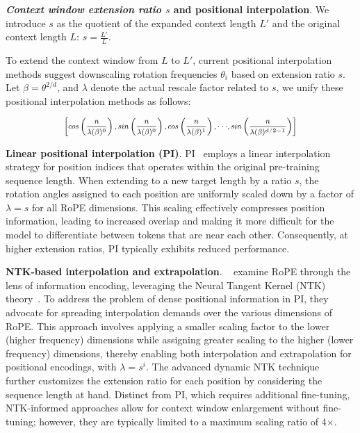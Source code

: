 \textbf{\emph{Context window extension ratio $s$} and positional interpolation}. We introduce $s$ as the quotient of the expanded context length $L'$ and the original context length $L$: $s=\frac{L'}{L}$.

To extend the context window from $L$ to $L'$, current positional interpolation methods suggest downscaling rotation frequencies $\theta_i$ based on extension ratio $s$. Let $\beta=\theta^{2/d}$, and $\lambda$ denote the actual rescale factor related to $s$, we   unify these positional interpolation methods as follows:

\begin{equation}	
	\fontsize{7.5}{7.5} \selectfont
	\label{eq:unified_rope}
	\begin{aligned}
		\left[cos\left(\frac{n}{\lambda(\beta)^0}\right), sin \left(\frac{n}{\lambda(\beta)^0}\right), cos\left(\frac{n}{\lambda(\beta)^1}\right), \cdot\cdot\cdot,  sin \left(\frac{n}{\lambda(\beta)^{d/2-1}}\right) \right]   
	\end{aligned}
\end{equation}

\textbf{Linear positional interpolation (PI)}. PI~\cite{pi} employs a linear interpolation strategy for position indices that operates within the original pre-training sequence length. When extending to a new target length by a ratio $s$, the rotation angles assigned to each position are uniformly scaled down by a factor of $\lambda=s$ for all RoPE dimensions. This scaling effectively compresses position information, leading to increased overlap and making it more difficult for the model to differentiate between tokens that are near each other. Consequently, at higher extension ratios, PI typically exhibits reduced performance.

\textbf{NTK-based interpolation and extrapolation}. ~\cite{ntk,dynamicntk} examine RoPE through the lens of information encoding, leveraging the Neural Tangent Kernel (NTK) theory~\cite{jacot2018neural,tancik2020fourier}. To address the problem of dense positional information in PI, they advocate for spreading interpolation demands over the various dimensions of RoPE. This approach involves applying a smaller scaling factor to the lower (higher frequency) dimensions while assigning greater scaling to the higher (lower frequency) dimensions, thereby enabling both interpolation and extrapolation for positional encodings, with $\lambda=s^{i}$. The advanced dynamic NTK technique~\cite{dynamicntk} further customizes the extension ratio for each position by considering the sequence length at hand. Distinct from PI, which requires additional fine-tuning, NTK-informed approaches allow for context window enlargement without fine-tuning; however, they are typically limited to a maximum scaling ratio of 4$\times$.

